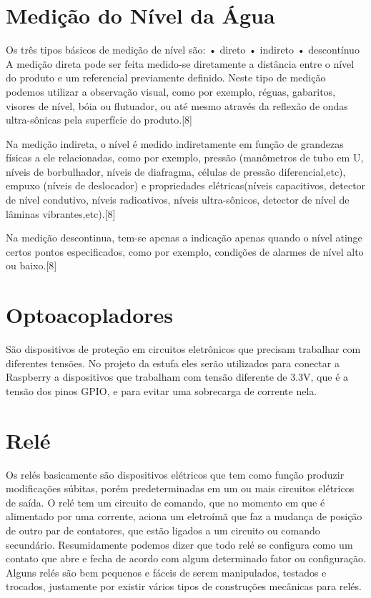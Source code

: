\section{Medição do Nível da Água}

Os três tipos básicos de medição de nível são:
• direto
• indireto
• descontínuo
A medição direta pode ser feita medido-se diretamente a distância entre o nível do produto e um referencial previamente definido. Neste tipo de medição podemos utilizar a observação visual, como por exemplo, réguas, gabaritos, visores de nível, bóia ou flutuador, ou até mesmo através da reflexão de ondas ultra-sônicas pela superfície do produto\cite{cassiolato2010}.[8]

Na medição indireta, o nível é medido indiretamente em função de grandezas físicas a ele relacionadas, como por exemplo, pressão (manômetros de tubo em U, níveis de borbulhador, níveis de diafragma, células de pressão diferencial,etc), empuxo (níveis de deslocador) e propriedades elétricas(níveis capacitivos, detector de nível condutivo, níveis radioativos, níveis ultra-sônicos, detector de nível de lâminas vibrantes,etc)\cite{cassiolato2010}.[8]

Na medição descontinua, tem-se apenas a indicação apenas quando o nível atinge certos pontos especificados, como por exemplo, condições de alarmes de nível alto ou baixo\cite{cassiolato2010}.[8]

\section{Optoacopladores}

São dispositivos de proteção em circuitos eletrônicos que precisam trabalhar com diferentes tensões. No projeto da estufa eles serão utilizados para conectar a Raspberry a dispositivos que trabalham com tensão diferente de 3.3V, que é a tensão dos pinos GPIO, e para evitar uma sobrecarga de corrente nela. \cite{vishay}

\section{Relé}

Os relés basicamente são dispositivos elétricos que tem como função produzir modificações súbitas, porém predeterminadas em um ou mais circuitos elétricos de saída. O relé tem um circuito de comando, que no momento em que é alimentado por uma corrente, aciona um eletroímã que faz a mudança de posição de outro par de contatores, que estão ligados a um circuito ou comando secundário. Resumidamente podemos dizer que todo relé se configura como um contato que abre e fecha de acordo com algum determinado fator ou configuração. Alguns relés são bem pequenos e fáceis de serem manipulados, testados e trocados, justamente por existir vários tipos de construções mecânicas para relés\cite{braga2012}.

